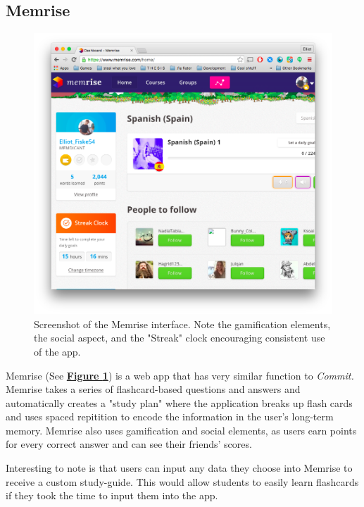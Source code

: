 \subsection{Memrise}

\begin{figure}
	\centering
	\includegraphics[width=1.0\linewidth]{memrise}
	\caption[Memrise]{Screenshot of the Memrise interface. Note the gamification elements, the social aspect, and the "Streak" clock encouraging consistent use of the app.}
	\label{fig:memrise}
\end{figure}

\par Memrise (See \textbf{\hyperref[fig:memrise]{Figure \ref*{fig:memrise}}}) is a web app that has very similar function to \textit{Commit.} Memrise takes a series of flashcard-based questions and answers and automatically creates a "study plan" where the application breaks up flash cards and uses spaced repitition to encode the information in the user's long-term memory. Memrise also uses gamification and social elements, as users earn points for every correct answer and can see their friends' scores.

\par Interesting to note is that users can input any data they choose into Memrise to receive a custom study-guide. This would allow students to easily learn flashcards if they took the time to input them into the app.

